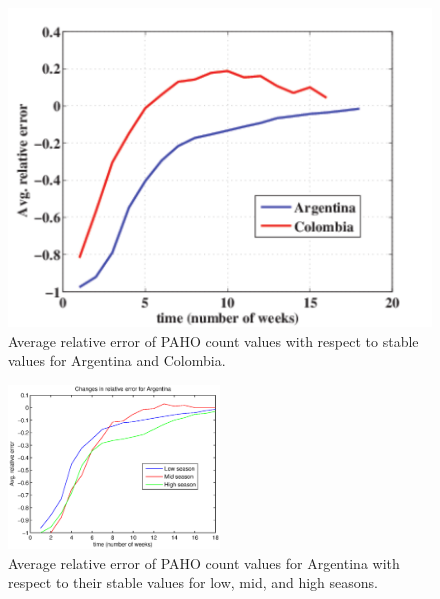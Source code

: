 \begin{figure}[h]
\centering
\includegraphics[width=.85\columnwidth]{fig/ArgentinaColombia.pdf}
\caption{Average relative error of PAHO count values with respect to stable values for
  Argentina and Colombia.
\label{fig:relerrors}
}
\end{figure}

\begin{figure}[h]
  \centering
    \includegraphics[width=0.5\textwidth]{fig/forpaper_seasonalAVGrelativeALLs_Argentina.eps}
  \caption{Average relative error of PAHO count values for Argentina with respect
  to their stable values for low, mid, and high seasons.}
  \label{fig:seasonal_relerrors}
\end{figure}  

